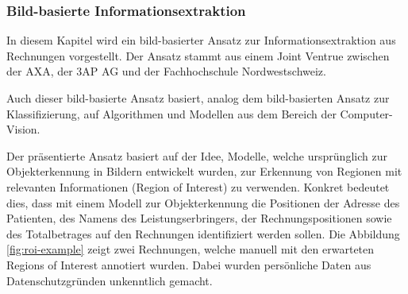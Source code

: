 \subsubsection{Bild-basierte Informationsextraktion}

In diesem Kapitel wird ein bild-basierter Ansatz zur Informationsextraktion aus Rechnungen vorgestellt. Der Ansatz stammt aus einem Joint Ventrue zwischen der AXA, der 3AP AG und der Fachhochschule Nordwestschweiz. 

Auch dieser bild-basierte Ansatz basiert, analog dem bild-basierten Ansatz zur Klassifizierung, auf Algorithmen und Modellen aus dem Bereich der Computer-Vision.

Der präsentierte Ansatz basiert auf der Idee, Modelle, welche ursprünglich zur Objekterkennung in Bildern entwickelt wurden, zur Erkennung von Regionen mit relevanten Informationen (Region of Interest) zu verwenden. Konkret bedeutet dies, dass mit einem Modell zur Objekterkennung die Positionen der Adresse des Patienten, des Namens des Leistungserbringers, der Rechnungspositionen sowie des Totalbetrages auf den Rechnungen identifiziert werden sollen. Die Abbildung \ref{fig:roi-example} zeigt zwei Rechnungen, welche manuell mit den erwarteten Regions of Interest annotiert wurden. Dabei wurden persönliche Daten aus Datenschutzgründen unkenntlich gemacht.

